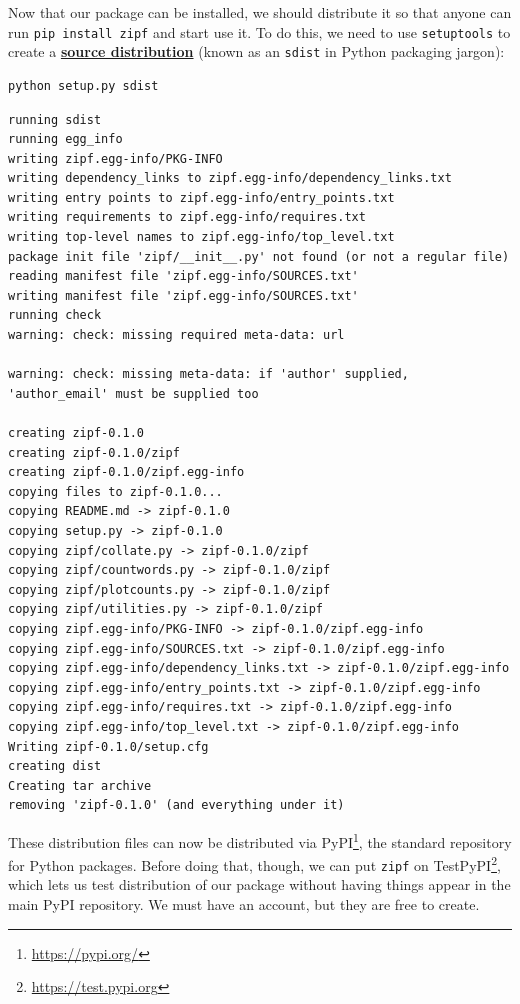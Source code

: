\documentclass[
]{krantz}
\renewcommand{\href}[2]{#2\footnote{\url{#1}}}
\newcommand{\gref}[2]{\hyperlink{#2}{\textbf{#1}}}
\begin{document}
Now that our package can be installed,
we should distribute it so that anyone can run \texttt{pip\ install\ zipf}
and start use it.
To do this,
we need to use \texttt{setuptools} to create
a \gref{source distribution}{source\_distribution}
(known as an \texttt{sdist} in Python packaging jargon):

\begin{verbatim}
python setup.py sdist
\end{verbatim}

\begin{verbatim}
running sdist
running egg_info
writing zipf.egg-info/PKG-INFO
writing dependency_links to zipf.egg-info/dependency_links.txt
writing entry points to zipf.egg-info/entry_points.txt
writing requirements to zipf.egg-info/requires.txt
writing top-level names to zipf.egg-info/top_level.txt
package init file 'zipf/__init__.py' not found (or not a regular file)
reading manifest file 'zipf.egg-info/SOURCES.txt'
writing manifest file 'zipf.egg-info/SOURCES.txt'
running check
warning: check: missing required meta-data: url

warning: check: missing meta-data: if 'author' supplied, 'author_email' must be supplied too

creating zipf-0.1.0
creating zipf-0.1.0/zipf
creating zipf-0.1.0/zipf.egg-info
copying files to zipf-0.1.0...
copying README.md -> zipf-0.1.0
copying setup.py -> zipf-0.1.0
copying zipf/collate.py -> zipf-0.1.0/zipf
copying zipf/countwords.py -> zipf-0.1.0/zipf
copying zipf/plotcounts.py -> zipf-0.1.0/zipf
copying zipf/utilities.py -> zipf-0.1.0/zipf
copying zipf.egg-info/PKG-INFO -> zipf-0.1.0/zipf.egg-info
copying zipf.egg-info/SOURCES.txt -> zipf-0.1.0/zipf.egg-info
copying zipf.egg-info/dependency_links.txt -> zipf-0.1.0/zipf.egg-info
copying zipf.egg-info/entry_points.txt -> zipf-0.1.0/zipf.egg-info
copying zipf.egg-info/requires.txt -> zipf-0.1.0/zipf.egg-info
copying zipf.egg-info/top_level.txt -> zipf-0.1.0/zipf.egg-info
Writing zipf-0.1.0/setup.cfg
creating dist
Creating tar archive
removing 'zipf-0.1.0' (and everything under it)
\end{verbatim}

These distribution files can now be distributed via \href{https://pypi.org/}{PyPI},
the standard repository for Python packages.
Before doing that,
though,
we can put \texttt{zipf} on \href{https://test.pypi.org}{TestPyPI},
which lets us test distribution of our package
without having things appear in the main PyPI repository.
We must have an account,
but they are free to create.
\end{document}
